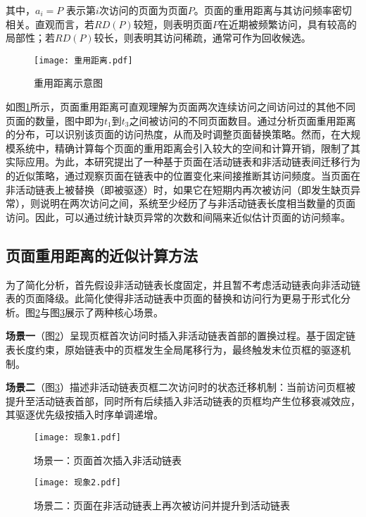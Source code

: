 其中，\(a_i=P\) 表示第\(i\)次访问的页面为页面\(P\)。页面的重用距离与其访问频率密切相关。直观而言，若\(RD(P)\)较短，则表明页面\(P\)在近期被频繁访问，具有较高的局部性；若\(RD(P)\)较长，则表明其访问稀疏，通常可作为回收候选。

\begin{figure}[htbp]
  \centering
  \texttt{[image: 重用距离.pdf]}
  \caption{重用距离示意图}
  \label{fig:refault_distance}
\end{figure}


如图\ref{fig:refault_distance}所示，页面重用距离可直观理解为页面两次连续访问之间访问过的其他不同页面的数量，图中即为\(t_1\)到\(t_3\)之间被访问的不同页面数目。通过分析页面重用距离的分布，可以识别该页面的访问热度，从而及时调整页面替换策略。然而，在大规模系统中，精确计算每个页面的重用距离会引入较大的空间和计算开销，限制了其实际应用。为此，本研究提出了一种基于页面在活动链表和非活动链表间迁移行为的近似策略，通过观察页面在链表中的位置变化来间接推断其访问频度。当页面在非活动链表上被替换（即被驱逐）时，如果它在短期内再次被访问（即发生缺页异常），则说明在两次访问之间，系统至少经历了与非活动链表长度相当数量的页面访问。因此，可以通过统计缺页异常的次数和间隔来近似估计页面的访问频率。

\subsection{页面重用距离的近似计算方法}
\label{sec:重用距离的近似推导}
为了简化分析，首先假设非活动链表长度固定，并且暂不考虑活动链表向非活动链表的页面降级。此简化使得非活动链表中页面的替换和访问行为更易于形式化分析。图\ref{fig:现象1}与图\ref{fig:现象2}展示了两种核心场景。

\textbf{场景一}（图\ref{fig:现象1}）呈现页框首次访问时插入非活动链表首部的置换过程。基于固定链表长度约束，原始链表中的页框发生全局尾移行为，最终触发末位页框的驱逐机制。

\textbf{场景二}（图\ref{fig:现象2}）描述非活动链表页框二次访问时的状态迁移机制：当前访问页框被提升至活动链表首部，同时所有后续插入非活动链表的页框均产生位移衰减效应，其驱逐优先级按插入时序单调递增。
\begin{figure}[H]
  \centering
  \texttt{[image: 现象1.pdf]}
  \caption{场景一：页面首次插入非活动链表}
  \label{fig:现象1}
\end{figure}

\begin{figure}[H]
  \centering
  \texttt{[image: 现象2.pdf]}
  \caption{场景二：页面在非活动链表上再次被访问并提升到活动链表}
  \label{fig:现象2}
\end{figure}

